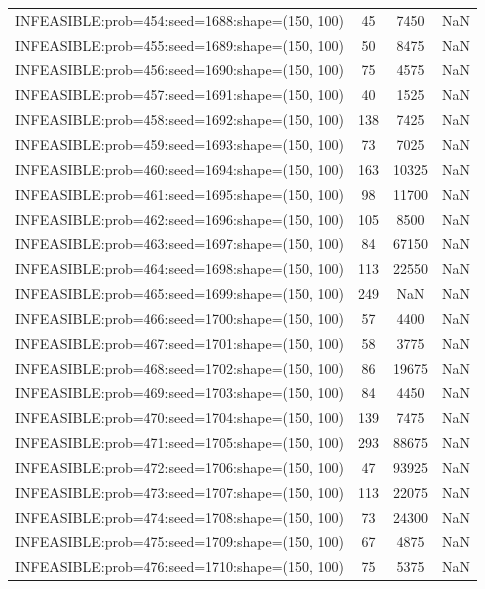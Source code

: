 \begin{longtable}{lccc}
INFEASIBLE:prob=454:seed=1688:shape=(150, 100) &    45 &  7450 &    NaN \\
INFEASIBLE:prob=455:seed=1689:shape=(150, 100) &    50 &  8475 &    NaN \\
INFEASIBLE:prob=456:seed=1690:shape=(150, 100) &    75 &  4575 &    NaN \\
INFEASIBLE:prob=457:seed=1691:shape=(150, 100) &    40 &  1525 &    NaN \\
INFEASIBLE:prob=458:seed=1692:shape=(150, 100) &   138 &  7425 &    NaN \\
INFEASIBLE:prob=459:seed=1693:shape=(150, 100) &    73 &  7025 &    NaN \\
INFEASIBLE:prob=460:seed=1694:shape=(150, 100) &   163 & 10325 &    NaN \\
INFEASIBLE:prob=461:seed=1695:shape=(150, 100) &    98 & 11700 &    NaN \\
INFEASIBLE:prob=462:seed=1696:shape=(150, 100) &   105 &  8500 &    NaN \\
INFEASIBLE:prob=463:seed=1697:shape=(150, 100) &    84 & 67150 &    NaN \\
INFEASIBLE:prob=464:seed=1698:shape=(150, 100) &   113 & 22550 &    NaN \\
INFEASIBLE:prob=465:seed=1699:shape=(150, 100) &   249 &   NaN &    NaN \\
INFEASIBLE:prob=466:seed=1700:shape=(150, 100) &    57 &  4400 &    NaN \\
INFEASIBLE:prob=467:seed=1701:shape=(150, 100) &    58 &  3775 &    NaN \\
INFEASIBLE:prob=468:seed=1702:shape=(150, 100) &    86 & 19675 &    NaN \\
INFEASIBLE:prob=469:seed=1703:shape=(150, 100) &    84 &  4450 &    NaN \\
INFEASIBLE:prob=470:seed=1704:shape=(150, 100) &   139 &  7475 &    NaN \\
INFEASIBLE:prob=471:seed=1705:shape=(150, 100) &   293 & 88675 &    NaN \\
INFEASIBLE:prob=472:seed=1706:shape=(150, 100) &    47 & 93925 &    NaN \\
INFEASIBLE:prob=473:seed=1707:shape=(150, 100) &   113 & 22075 &    NaN \\
INFEASIBLE:prob=474:seed=1708:shape=(150, 100) &    73 & 24300 &    NaN \\
INFEASIBLE:prob=475:seed=1709:shape=(150, 100) &    67 &  4875 &    NaN \\
INFEASIBLE:prob=476:seed=1710:shape=(150, 100) &    75 &  5375 &    NaN \\

\end{longtable}
